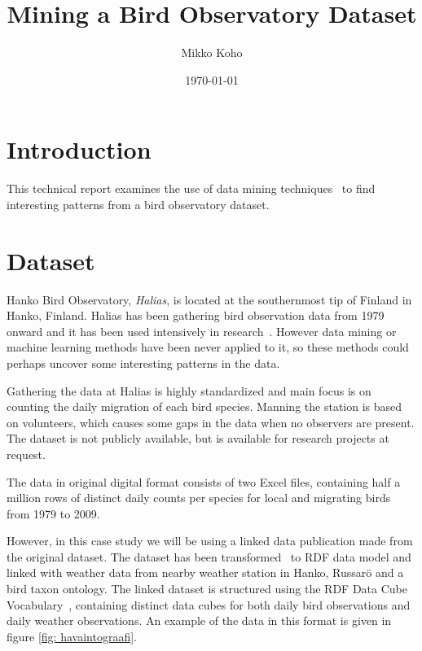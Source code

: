 \documentclass[english]{tktltiki2}
\title{Mining a Bird Observatory Dataset}
\author{Mikko Koho}
\date{\today}
\begin{document}
    

\frontmatter      %

\maketitle        %

\makeabstract     %

\tableofcontents  %


\mainmatter       %


\section{Introduction}

This technical report examines the use of data mining techniques~\cite{tan2006introduction} to find interesting patterns from a bird observatory dataset.



\section{Dataset}

Hanko Bird Observatory, \emph{Halias}, is located at the southernmost tip of Finland in Hanko, Finland. Halias has been gathering bird observation data from 1979 onward and it has been used intensively in research~\cite{HangonJulkaisut}. However data mining or machine learning methods have been never applied to it, so these methods could perhaps uncover some interesting patterns in the data.

Gathering the data at Halias is highly standardized and main focus is on counting the daily migration of each bird species. Manning the station is based on volunteers, which causes some gaps in the data when no observers are present.
The dataset is not publicly available, but is available for research projects at request.

The data in original digital format consists of two Excel files, containing half a million rows of distinct daily counts per species for local and migrating birds from 1979 to 2009.

However, in this case study we will be using a linked data publication made from the original dataset. The dataset has been transformed~\cite{koho-hyvonen-orni-2014, koho2015gradu} to RDF data model and linked with weather data from nearby weather station in Hanko, Russarö and a bird taxon ontology. %
The linked dataset is structured using the RDF Data Cube Vocabulary~\cite{w3crdfdatacube}, containing distinct data cubes for both daily bird observations and daily weather observations. An example of the data in this format is given in figure \ref{fig: havaintograafi}.
\end{document}
